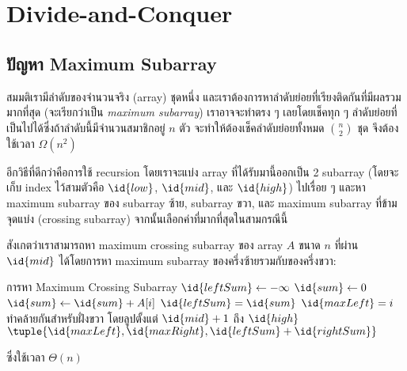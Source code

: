 \chapter{Divide-and-Conquer}

\section{ปัญหา Maximum Subarray}

สมมติเรามีลำดับของจำนวนจริง (array) ชุดหนึ่ง และเราต้องการหาลำดับย่อยที่เรียงติดกันที่มีผลรวมมากที่สุด (จะเรียกว่าเป็น \emph{maximum subarray}) เราอาจจะทำตรง ๆ เลยโดยเช็คทุก ๆ ลำดับย่อยที่เป็นไปได้ซึ่งถ้าลำดับนี้มีจำนวนสมาชิกอยู่ $n$ ตัว จะทำให้ต้องเช็คลำดับย่อยทั้งหมด $\binom{n}{2}$ ชุด จึงต้องใช้เวลา $\Omega(n^2)$

อีกวิธีที่ดีกว่าคือการใช้ recursion โดยเราจะแบ่ง array ที่ได้รับมานี้ออกเป็น 2 subarray (โดยจะเก็บ index ไว้สามตัวคือ $\id{low}$, $\id{mid}$, และ $\id{high}$) ไปเรื่อย ๆ และหา maximum subarray ของ subarray ซ้าย, subarray ขวา, และ maximum subarray ที่ข้ามจุดแบ่ง (crossing subarray) จากนั้นเลือกค่าที่มากที่สุดในสามกรณีนี้

สังเกตว่าเราสามารถหา maximum crossing subarray ของ array $A$ ขนาด $n$ ที่ผ่าน $\id{mid}$ ได้โดยการหา maximum subarray ของครึ่งซ้ายรวมกับของครึ่งขวา:
\begin{codebox}{การหา Maximum Crossing Subarray}
		\State $\id{leftSum} \gets -\infty$
		\State $\id{sum} \gets 0$
			\State $\id{sum} \gets \id{sum} + A[i]$
				\State $\id{leftSum} = \id{sum}$
				\State $\id{maxLeft} = i$
			\EndIf
		\EndFor
		\State ทำคล้ายกันสำหรับฝั่งขวา โดยลูปตั้งแต่ $\id{mid}+1$ ถึง $\id{high}$
		\State \Return $\tuple{\id{maxLeft}, \id{maxRight}, \id{leftSum} + \id{rightSum}}$
	\EndFunction
\end{codebox}
ซึ่งใช้เวลา $\Theta(n)$

